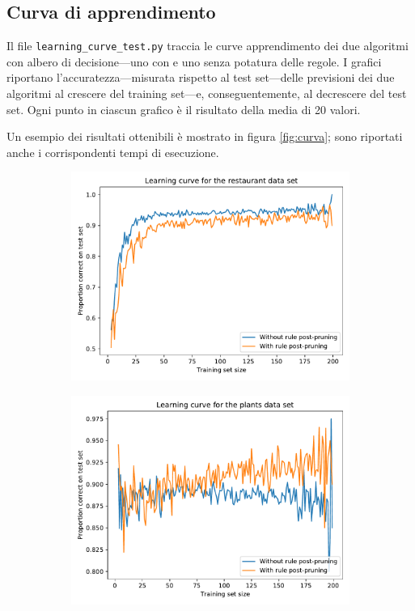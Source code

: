 \documentclass{article}
\begin{document}
	\subsection{Curva di apprendimento} \label{sec:curva}
	Il file \texttt{learning\_curve\_test.py} traccia le curve apprendimento dei due algoritmi con albero di decisione---uno con e uno senza potatura delle regole. I grafici riportano l'accuratezza---misurata rispetto al test set---delle previsioni dei due algoritmi al crescere del training set---e, conseguentemente, al decrescere del test set. Ogni punto in ciascun grafico è il risultato della media di 20 valori.
	
	Un esempio dei risultati ottenibili è mostrato in figura \ref{fig:curva}; sono riportati anche i corrispondenti tempi di esecuzione.
	\begin{figure}[t]
		\centering
		\begin{subfigure}{0.45\textwidth} 
			\includegraphics[width=\textwidth]{restaurant_4min.pdf}      
		\end{subfigure}    
		\hfill
		\begin{subfigure}{0.45\textwidth} 
			\includegraphics[width=\textwidth]{plants_5min.pdf}    
		\end{subfigure}    
	

\end{figure}
\end{document}
